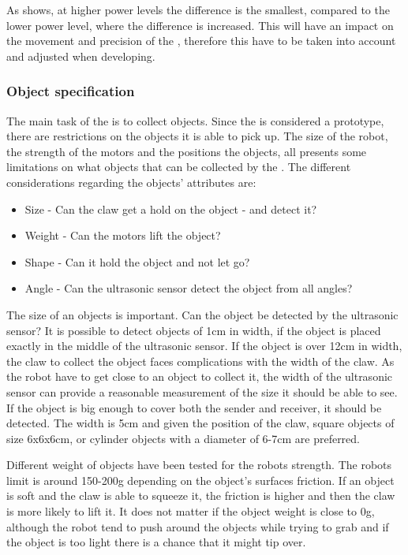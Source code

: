 As  shows, at higher power levels the difference is the smallest, compared to the lower power level, where the difference is increased. This will have an impact on the movement and precision of the \projname{}, therefore this have to be taken into account and adjusted when developing. 

\subsubsection{Object specification} \label{sec:object_specification}
The main task of the \projname{} is to collect objects. Since the \projname{} is considered a prototype, there are restrictions on the objects it is able to pick up. The size of the robot, the strength of the motors and the positions the objects, all presents some limitations on what objects that can be collected by the \projname{}. The different considerations regarding the objects' attributes are:

\begin{itemize}
\item Size - Can the claw get a hold on the object - and detect it? %
\item Weight - Can the motors lift the object? %
\item Shape - Can it hold the object and not let go? %
\item Angle - Can the ultrasonic sensor detect the object from all angles? %
\end{itemize}

The size of an objects is important. Can the object be detected by the ultrasonic sensor? It is possible to detect objects of 1cm in width, if the object is placed exactly in the middle of the ultrasonic sensor. If the object is over 12cm in width, the claw to collect the object faces complications with the width of the claw. As the robot have to get close to an object to collect it, the width of the ultrasonic sensor can provide a reasonable measurement of the size it should be able to see. If the object is big enough to cover both the sender and receiver, it should be detected. The width is 5cm and given the position of the claw, square objects of size 6x6x6cm, or cylinder objects with a diameter of 6-7cm are preferred.

Different weight of objects have been tested for the robots strength. The robots limit is around 150-200g depending on the object's surfaces friction. If an object is soft and the claw is able to squeeze it, the friction is higher and then the claw is more likely to lift it. It does not matter if the object weight is close to 0g, although the robot tend to push around the objects while trying to grab and if the object is too light there is a chance that it might tip over.

